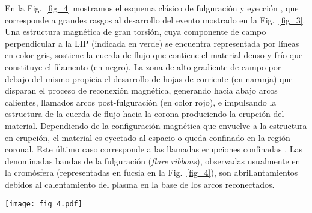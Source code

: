 \documentclass[baaa]{baaa}
\begin{document}
En la Fig.~\ref{fig_4} mostramos el esquema clásico de fulguración y eyección \citep[ver p. ej.,][]{forbes2000,shiota2005}, que corresponde a grandes rasgos al desarrollo del evento mostrado en la Fig.~\ref{fig_3}. Una estructura magnética de gran torsión, cuya componente de campo perpendicular a la LIP (indicada en verde) se encuentra representada por líneas en color gris, sostiene la cuerda de flujo que contiene el material denso y frío que constituye el filamento (en negro). La zona de alto gradiente de campo por debajo del mismo propicia el desarrollo de hojas de corriente (en naranja) que disparan el proceso de reconexión magnética, generando hacia abajo arcos calientes, llamados arcos post-fulguración (en color rojo), e impulsando la estructura de la cuerda de flujo hacia la corona produciendo la erupción del material. Dependiendo de la configuración magnética que envuelve a la estructura en erupción, el material es eyectado al espacio o queda confinado en la región coronal. Este último caso corresponde a las llamadas erupciones confinadas \citep[ver p. ej.,][]{chen2023}. Las denominadas bandas de la fulguración ({\sl flare ribbons}), observadas usualmente en la cromósfera (representadas en fucsia en la Fig.~\ref{fig_4}), son abrillantamientos debidos al calentamiento del plasma en la base de los arcos reconectados.

\begin{figure*}[!t]
\centering
\texttt{[image: fig\_4.pdf]}
\caption{Esquema clásico de una fulguración eruptiva como la mostrada en la Fig.~\ref{fig_3}. Las líneas de campo en gris corresponden a la componente del campo perpendicular a la dirección de la línea de inversión de polaridad (en verde). Las flechas indican la dirección del campo en las líneas. En negro se representa la cuerda de flujo que sostiene el material denso que forma el filamento y que se encuentra inicialmente sostenido por el campo magnético de la configuración. La desestabilización producida por el desarrollo impulsivo de hojas de corriente (representadas con segmentos naranja), genera reconexión magnética que da lugar a arcos calientes (identificados en rojo), cuyas bases cromosféricas forman las bandas brillantes de la fulguración. Al mismo tiempo, la cuerda de flujo es impulsada hacia la corona superior produciendo la eyección del material. El esquema está inspirado en la representación brindada por \citet{shiota2005} de la configuración clásica dada, entre otros, por \citet{forbes2000}.}
\label{fig_4}
\end{figure*}
\end{document}
